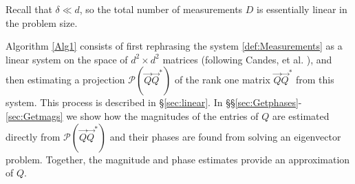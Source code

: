 \documentclass[]{spie}  %
\def \vec{\overrightarrow}
\begin{document}
 Recall that $\delta \ll d$, so the total number of measurements $D$ is essentially linear in the problem size.

Algorithm \ref{Alg1} consists of first rephrasing the system \eqref{def:Measurements} as a linear system on the space of $d^2 \times d^2$ matrices (following Candes, et al. \cite{candes2013phaselift}), and then estimating a projection $\mathcal{P}( \vec{Q}\vec{Q}^*)$ of the rank one matrix $\vec{Q}\vec{Q}^*$ from this system.  This process is described in \S\ref{sec:linear}.  In \S\S\ref{sec:Getphases}-\ref{sec:Getmags} we show how the magnitudes of the entries of $Q$ are estimated directly from $\mathcal{P}(\vec{Q}\vec{Q}^*)$ and their phases are found from solving an eigenvector problem.  Together, the magnitude and phase estimates provide an approximation of $Q$.

\end{document}
